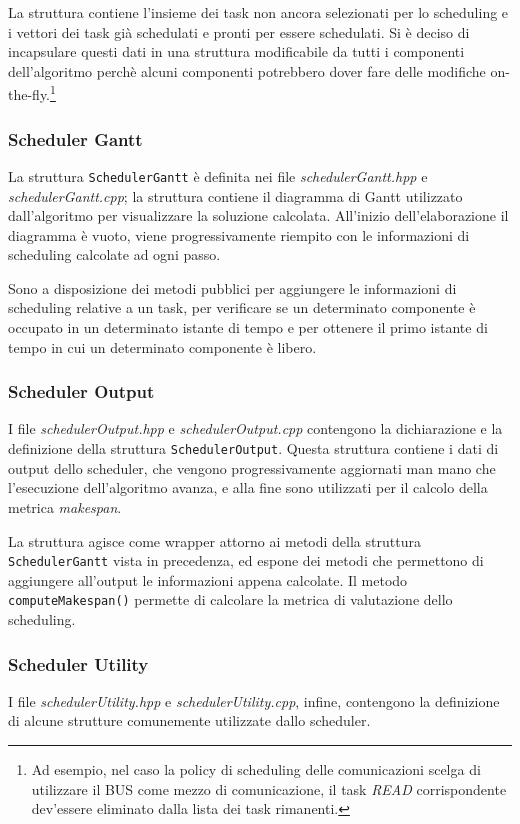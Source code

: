 La struttura contiene l'insieme dei task non ancora 
selezionati per lo scheduling e i vettori dei task già schedulati e pronti per 
essere schedulati. Si è deciso di incapsulare questi dati in una struttura 
modificabile da tutti i componenti dell'algoritmo perchè alcuni componenti 
potrebbero dover fare delle modifiche on-the-fly.\footnote{Ad esempio, nel caso 
la policy di scheduling delle comunicazioni scelga di utilizzare il BUS come 
mezzo di comunicazione, il task \emph{READ} corrispondente dev'essere 
eliminato dalla lista dei task rimanenti.}

\subsubsection{Scheduler Gantt}
La struttura \verb+SchedulerGantt+ è definita nei file 
\emph{schedulerGantt.hpp} e \emph{schedulerGantt.cpp}; la struttura contiene il 
diagramma di Gantt utilizzato dall'algoritmo per visualizzare la soluzione 
calcolata. All'inizio dell'elaborazione il diagramma è vuoto, viene 
progressivamente riempito con le informazioni di scheduling calcolate ad ogni 
passo.

Sono a disposizione dei metodi pubblici per aggiungere le informazioni di 
scheduling relative a un task, per verificare se un determinato componente è 
occupato in un determinato istante di tempo e per ottenere il primo istante di 
tempo in cui un determinato componente è libero.

\subsubsection{Scheduler Output}
I file \emph{schedulerOutput.hpp} e \emph{schedulerOutput.cpp} contengono la 
dichiarazione e la definizione della struttura \verb+SchedulerOutput+. Questa 
struttura contiene i dati di output dello scheduler, che vengono 
progressivamente aggiornati man mano che l'esecuzione dell'algoritmo avanza, e 
alla fine sono utilizzati per il calcolo della metrica \emph{makespan}.

La struttura agisce come wrapper attorno ai 
metodi della struttura \verb+SchedulerGantt+ vista in precedenza, ed espone dei 
metodi che permettono di aggiungere all'output le informazioni appena calcolate.
Il metodo \verb+computeMakespan()+ permette di calcolare la metrica di valutazione
dello scheduling.

\subsubsection{Scheduler Utility}
I file \emph{schedulerUtility.hpp} e \emph{schedulerUtility.cpp}, infine, 
contengono la definizione di alcune strutture comunemente utilizzate dallo 
scheduler.

